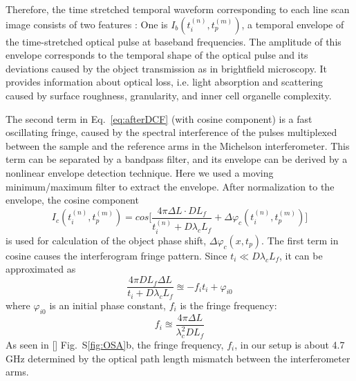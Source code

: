 \documentclass[aps,pra,reprint,longbibliography,superscriptaddress]{revtex4-1}
\begin{document}
Therefore, the time stretched temporal waveform corresponding to each line scan image consists of two features \cite{mahjoubfar2014label}: One is $I_b (t_i^{(n)}, t_p^{(m)})$, a temporal envelope of the time-stretched optical pulse at baseband frequencies. The amplitude of this envelope corresponds to the temporal shape of the optical pulse and its deviations caused by the object transmission as in brightfield microscopy. It provides information about optical loss, i.e. light absorption and scattering caused by surface roughness, granularity, and inner cell organelle complexity. 

The second term in Eq.~\ref{eq:afterDCF} (with cosine component) is a fast oscillating fringe, caused by the spectral interference of the pulses multiplexed between the sample and the reference arms in the Michelson interferometer. This term can be separated by a bandpass filter, and its envelope can be derived by a nonlinear envelope detection technique. Here we used a moving minimum/maximum filter to extract the envelope. After normalization to the envelope, the cosine component 
\begin{equation}
I_c (t_i^{(n)}, t_p^{(m)}) = cos\Bigg[ \frac{4\pi\Delta L \cdot D L_f}{t_i^{(n)} + D\lambda_c L_f} + \Delta \varphi_c(t_i^{(n)}, t_p^{(m)}) \Bigg]
\end{equation}
is used for calculation of the object phase shift, $\Delta\varphi_c(x,t_p)$. The first term in cosine causes the interferogram fringe pattern. Since $t_i \ll D \lambda_c L_f$, it can be approximated as
\begin{equation}
\frac{4\pi D L_f \Delta L}{t_i + D \lambda_c L_f} \approxeq - f_i t_i + \varphi_{i0}
\end{equation}
where $\varphi_{i0}$ is an initial phase constant, $f_i$ is the fringe frequency:
\begin{equation}
f_i \approxeq \frac{4\pi \Delta L}{\lambda_c^2 D L_f}
\end{equation}
As seen in [] Fig.~S\ref{fig:OSA}b, the fringe frequency, $f_i$, in our setup is about 4.7 GHz determined by the optical path length mismatch between the interferometer arms.
\end{document}
